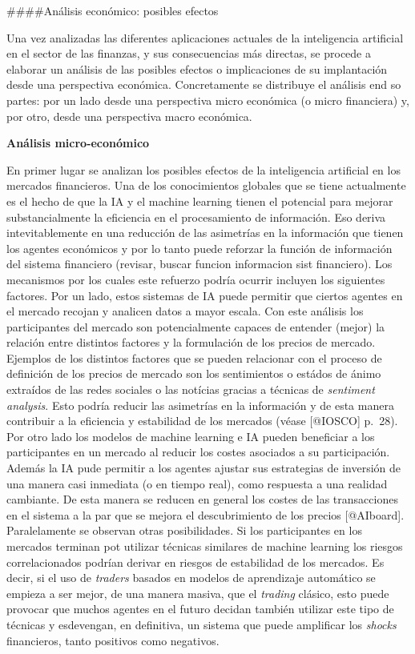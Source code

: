 \documentclass[]{article}
\begin{document}
\#\#\#\#Análisis económico: posibles efectos

Una vez analizadas las diferentes aplicaciones actuales de la
inteligencia artificial en el sector de las finanzas, y sus
consecuencias más directas, se procede a elaborar un análisis de las
posibles efectos o implicaciones de su implantación desde una
perspectiva económica. Concretamente se distribuye el análisis end so
partes: por un lado desde una perspectiva micro económica (o micro
financiera) y, por otro, desde una perspectiva macro económica.

\textbf{Análisis micro-económico}

En primer lugar se analizan los posibles efectos de la inteligencia
artificial en los mercados financieros. Una de los conocimientos
globales que se tiene actualmente es el hecho de que la IA y el machine
learning tienen el potencial para mejorar substancialmente la eficiencia
en el procesamiento de información. Eso deriva intevitablemente en una
reducción de las asimetrías en la información que tienen los agentes
económicos y por lo tanto puede reforzar la función de información del
sistema financiero (revisar, buscar funcion informacion sist
financiero). Los mecanismos por los cuales este refuerzo podría ocurrir
incluyen los siguientes factores. Por un lado, estos sistemas de IA
puede permitir que ciertos agentes en el mercado recojan y analicen
datos a mayor escala. Con este análisis los participantes del mercado
son potencialmente capaces de entender (mejor) la relación entre
distintos factores y la formulación de los precios de mercado. Ejemplos
de los distintos factores que se pueden relacionar con el proceso de
definición de los precios de mercado son los sentimientos o estádos de
ánimo extraídos de las redes sociales o las notícias gracias a técnicas
de \emph{sentiment analysis}. Esto podría reducir las asimetrías en la
información y de esta manera contribuir a la eficiencia y estabilidad de
los mercados (véase {[}@IOSCO{]} p.~28). Por otro lado los modelos de
machine learning e IA pueden beneficiar a los participantes en un
mercado al reducir los costes asociados a su participación. Además la IA
pude permitir a los agentes ajustar sus estrategias de inversión de una
manera casi inmediata (o en tiempo real), como respuesta a una realidad
cambiante. De esta manera se reducen en general los costes de las
transacciones en el sistema a la par que se mejora el descubrimiento de
los precios {[}@AIboard{]}. Paralelamente se observan otras
posibilidades. Si los participantes en los mercados terminan pot
utilizar técnicas similares de machine learning los riesgos
correlacionados podrían derivar en riesgos de estabilidad de los
mercados. Es decir, si el uso de \emph{traders} basados en modelos de
aprendizaje automático se empieza a ser mejor, de una manera masiva, que
el \emph{trading} clásico, esto puede provocar que muchos agentes en el
futuro decidan también utilizar este tipo de técnicas y esdevengan, en
definitiva, un sistema que puede amplificar los \emph{shocks}
financieros, tanto positivos como negativos.
\end{document}
